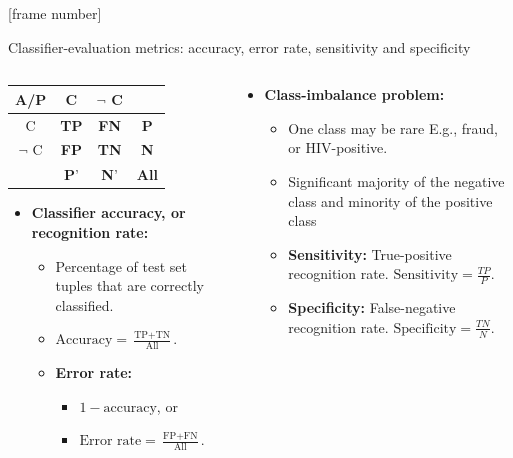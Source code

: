 \documentclass[aspectratio=169,t,table]{beamer}
\begin{document}
  {
    [frame number]
    \begin{frame}{Classifier-evaluation metrics: accuracy, error rate, sensitivity and specificity}
      \begin{columns}
        \begin{column}{0.5\textwidth}
          \centering
          \begin{tabular}{|c|c|c|c|}
            \hline
            A/P & C & $\neg$ C & \\\hline
            C & \textbf{TP} & \textbf{FN} & \textbf{P}\\\hline
            $\neg$ C & \textbf{FP} & \textbf{TN} & \textbf{N} \\\hline
            & \textbf{P}' & \textbf{N}' & \textbf{All}\\\hline
          \end{tabular}
          \begin{itemize}
            \item \textbf{Classifier accuracy, or recognition rate:}
            \begin{itemize}
              \item Percentage of test set tuples that are correctly classified.
              \item $\text{Accuracy} = \frac{\text{TP} + \text{TN}}{\text{All}}.$
              \item \textbf{Error rate:}
                \begin{itemize}
                  \item $1-\text{accuracy}$, or
                  \item $\text{Error rate} = \frac{\text{FP}+\text{FN}}{\text{All}}.$
                \end{itemize}
            \end{itemize}
          \end{itemize}
        \end{column}
        \begin{column}{0.5\textwidth}
          \begin{itemize}
            \item \textbf{Class-imbalance problem:}
            \begin{itemize}
              \item One class may be rare E.g., fraud, or HIV-positive.
              \item Significant majority of the negative class and minority of the positive class
              \item \textbf{Sensitivity:} True-positive recognition rate. $\text{Sensitivity} = \frac{TP}{P}$.
              \item \textbf{Specificity:} False-negative recognition rate. $\text{Specificity} = \frac{TN}{N}$.
            \end{itemize}
          \end{itemize}
        \end{column}
      \end{columns}
    \end{frame}
  }
\end{document}
